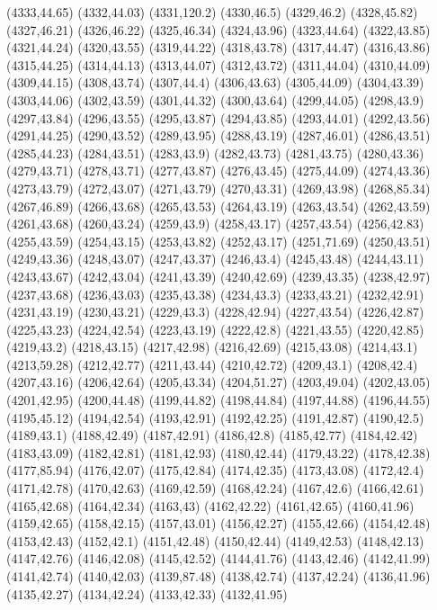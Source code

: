 (4333,44.65)
(4332,44.03)
(4331,120.2)
(4330,46.5)
(4329,46.2)
(4328,45.82)
(4327,46.21)
(4326,46.22)
(4325,46.34)
(4324,43.96)
(4323,44.64)
(4322,43.85)
(4321,44.24)
(4320,43.55)
(4319,44.22)
(4318,43.78)
(4317,44.47)
(4316,43.86)
(4315,44.25)
(4314,44.13)
(4313,44.07)
(4312,43.72)
(4311,44.04)
(4310,44.09)
(4309,44.15)
(4308,43.74)
(4307,44.4)
(4306,43.63)
(4305,44.09)
(4304,43.39)
(4303,44.06)
(4302,43.59)
(4301,44.32)
(4300,43.64)
(4299,44.05)
(4298,43.9)
(4297,43.84)
(4296,43.55)
(4295,43.87)
(4294,43.85)
(4293,44.01)
(4292,43.56)
(4291,44.25)
(4290,43.52)
(4289,43.95)
(4288,43.19)
(4287,46.01)
(4286,43.51)
(4285,44.23)
(4284,43.51)
(4283,43.9)
(4282,43.73)
(4281,43.75)
(4280,43.36)
(4279,43.71)
(4278,43.71)
(4277,43.87)
(4276,43.45)
(4275,44.09)
(4274,43.36)
(4273,43.79)
(4272,43.07)
(4271,43.79)
(4270,43.31)
(4269,43.98)
(4268,85.34)
(4267,46.89)
(4266,43.68)
(4265,43.53)
(4264,43.19)
(4263,43.54)
(4262,43.59)
(4261,43.68)
(4260,43.24)
(4259,43.9)
(4258,43.17)
(4257,43.54)
(4256,42.83)
(4255,43.59)
(4254,43.15)
(4253,43.82)
(4252,43.17)
(4251,71.69)
(4250,43.51)
(4249,43.36)
(4248,43.07)
(4247,43.37)
(4246,43.4)
(4245,43.48)
(4244,43.11)
(4243,43.67)
(4242,43.04)
(4241,43.39)
(4240,42.69)
(4239,43.35)
(4238,42.97)
(4237,43.68)
(4236,43.03)
(4235,43.38)
(4234,43.3)
(4233,43.21)
(4232,42.91)
(4231,43.19)
(4230,43.21)
(4229,43.3)
(4228,42.94)
(4227,43.54)
(4226,42.87)
(4225,43.23)
(4224,42.54)
(4223,43.19)
(4222,42.8)
(4221,43.55)
(4220,42.85)
(4219,43.2)
(4218,43.15)
(4217,42.98)
(4216,42.69)
(4215,43.08)
(4214,43.1)
(4213,59.28)
(4212,42.77)
(4211,43.44)
(4210,42.72)
(4209,43.1)
(4208,42.4)
(4207,43.16)
(4206,42.64)
(4205,43.34)
(4204,51.27)
(4203,49.04)
(4202,43.05)
(4201,42.95)
(4200,44.48)
(4199,44.82)
(4198,44.84)
(4197,44.88)
(4196,44.55)
(4195,45.12)
(4194,42.54)
(4193,42.91)
(4192,42.25)
(4191,42.87)
(4190,42.5)
(4189,43.1)
(4188,42.49)
(4187,42.91)
(4186,42.8)
(4185,42.77)
(4184,42.42)
(4183,43.09)
(4182,42.81)
(4181,42.93)
(4180,42.44)
(4179,43.22)
(4178,42.38)
(4177,85.94)
(4176,42.07)
(4175,42.84)
(4174,42.35)
(4173,43.08)
(4172,42.4)
(4171,42.78)
(4170,42.63)
(4169,42.59)
(4168,42.24)
(4167,42.6)
(4166,42.61)
(4165,42.68)
(4164,42.34)
(4163,43)
(4162,42.22)
(4161,42.65)
(4160,41.96)
(4159,42.65)
(4158,42.15)
(4157,43.01)
(4156,42.27)
(4155,42.66)
(4154,42.48)
(4153,42.43)
(4152,42.1)
(4151,42.48)
(4150,42.44)
(4149,42.53)
(4148,42.13)
(4147,42.76)
(4146,42.08)
(4145,42.52)
(4144,41.76)
(4143,42.46)
(4142,41.99)
(4141,42.74)
(4140,42.03)
(4139,87.48)
(4138,42.74)
(4137,42.24)
(4136,41.96)
(4135,42.27)
(4134,42.24)
(4133,42.33)
(4132,41.95)
